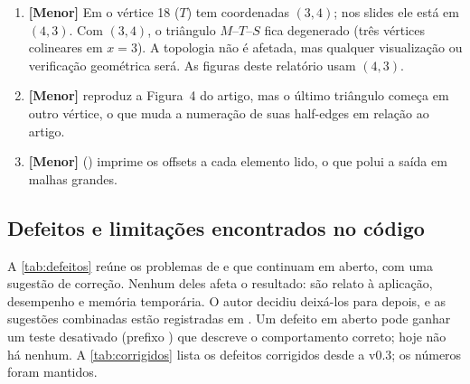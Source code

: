 \begin{enumerate}[label=\textbf{D\arabic*.}, leftmargin=2.3em]
\item \textbf{[Menor]} Em  o vértice 18 ($T$) tem coordenadas $(3,4)$; nos slides ele está em
$(4,3)$. Com $(3,4)$, o triângulo $M$--$T$--$S$ fica degenerado (três vértices colineares em $x=3$). A topologia não é
afetada, mas qualquer visualização ou verificação geométrica será. As figuras deste relatório usam $(4,3)$.
\item \textbf{[Menor]}  reproduz a Figura~4 do artigo, mas o último triângulo começa em outro
vértice, o que muda a numeração de suas half-edges em relação ao artigo.
\item \textbf{[Menor]}  () imprime os offsets a cada elemento lido, o que polui a
saída em malhas grandes.
\end{enumerate}

\subsection{Defeitos e limitações encontrados no código}
\label{sec:defeitos}

A \cref{tab:defeitos} reúne os problemas de  e  que continuam em aberto,
com uma sugestão de correção. Nenhum deles afeta o resultado: são relato à aplicação, desempenho e memória
temporária. O autor decidiu deixá-los para depois, e as sugestões combinadas estão registradas em
. Um defeito em aberto pode ganhar um teste desativado (prefixo ) que
descreve o comportamento correto; hoje não há nenhum. A \cref{tab:corrigidos} lista os defeitos corrigidos desde a
v0.3; os números foram mantidos.

